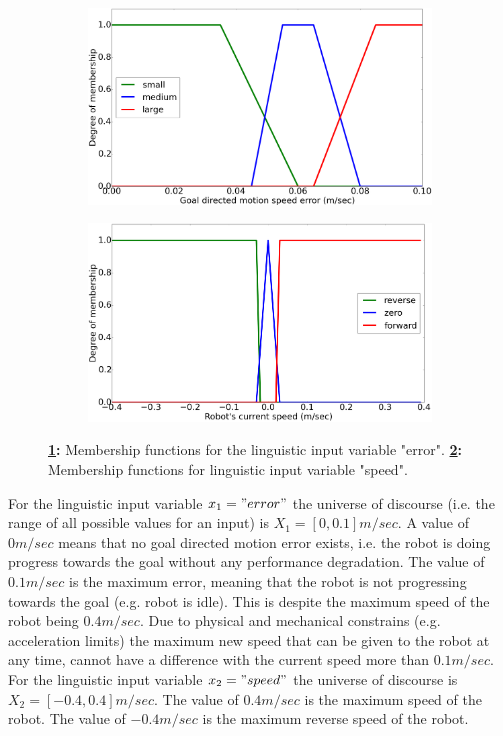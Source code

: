 \documentclass[a4paper,12pt,oneside,openright]{bhamthesis}
\begin{document}
\begin{figure}
		\centering
		\begin{subfigure}[b]{0.49\textwidth}
			\centering
			\includegraphics[width=\textwidth]{chapter5_fig/fuzzy_error.png}
			\caption{}
			\label{subfig:fuzzy_error}
		\end{subfigure}
		\hfill
		\begin{subfigure}[b]{0.49\textwidth}
			\centering
			\includegraphics[width=\textwidth]{chapter5_fig/fuzzy_speed.png}
			\caption{}
			\label{subfig:fuzzy_speed}
		\end{subfigure}
		\hfill
		\caption{\textbf{\ref{subfig:fuzzy_error}:} Membership functions for the linguistic input variable "error". \textbf{\ref{subfig:fuzzy_speed}:} Membership functions for linguistic input variable "speed".}
		\label{fig:fuzzy_input}
\end{figure}

For the linguistic input variable $x_1 = "error"$ the universe of discourse (i.e. the range of all possible values for an input) is $X_1 =[0,0.1] m/sec$. A value of $0 m/sec$ means that no goal directed motion error exists, i.e. the robot is doing progress towards the goal without any performance degradation. The value of $0.1 m/sec$ is the maximum error, meaning that the robot is not progressing towards the goal (e.g. robot is idle). This is despite the maximum speed of the robot being $0.4 m/sec$. Due to physical and mechanical constrains (e.g. acceleration limits) the maximum new speed that can be given to the robot at any time, cannot have a difference with the current speed more than $0.1 m/sec$. For the linguistic input variable $x_2 = "speed"$ the universe of discourse is $X_2 = [-0.4,0.4] m/sec$. The value of $0.4 m/sec$ is the maximum speed of the robot. The value of $-0.4 m/sec$ is the maximum reverse speed of the robot. 
\end{document}
